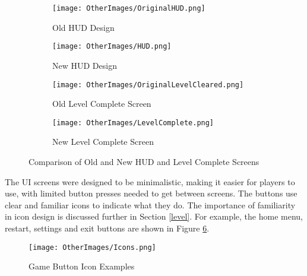 \documentclass[10pt]{final_report}
\begin{document}
\begin{figure}[H]
    \centering
    \begin{subfigure}{0.45\textwidth}
        \centering
        \texttt{[image: OtherImages/OriginalHUD.png]}
        \caption{Old HUD Design}
        \label{fig:old_hud}
    \end{subfigure}
    \hfill
    \begin{subfigure}{0.45\textwidth}
        \centering
        \texttt{[image: OtherImages/HUD.png]}
        \caption{New HUD Design}
        \label{fig:new_hud}
    \end{subfigure}
    
    \vspace{1em} %

    \begin{subfigure}{0.45\textwidth}
        \centering
        \texttt{[image: OtherImages/OriginalLevelCleared.png]}
        \caption{Old Level Complete Screen}
        \label{fig:old_complete}
    \end{subfigure}
    \hfill
    \begin{subfigure}{0.45\textwidth}
        \centering
        \texttt{[image: OtherImages/LevelComplete.png]}
        \caption{New Level Complete Screen}
        \label{fig:new_complete}
    \end{subfigure}

    \caption{Comparison of Old and New HUD and Level Complete Screens}
    \label{fig:hud_comparison}
\end{figure}
The UI screens were designed to be minimalistic, making it easier for players to use, with limited button presses needed to get between screens. The buttons use clear and familiar icons to indicate what they do. The importance of familiarity in icon design is discussed further in Section \ref{level}. For example, the home menu, restart, settings and exit buttons are shown in Figure \ref{fig:label_icons}. 

\begin{figure}[H]
    \centering
    \texttt{[image: OtherImages/Icons.png]}
    \caption{Game Button Icon Examples}
    \label{fig:label_icons}
\end{figure}
\end{document}
